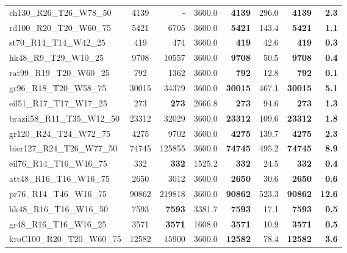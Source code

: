 \documentclass{singlecol-new}
\theoremstyle{TH}{
\newtheorem{lemma}{Lemma}
\newtheorem{theorem}[lemma]{Theorem}
\newtheorem{corrolary}[lemma]{Corrolary}
\newtheorem{conjecture}[lemma]{Conjecture}
\newtheorem{proposition}[lemma]{Proposition}
\newtheorem{claim}[lemma]{Claim}
\newtheorem{stheorem}[lemma]{Wrong Theorem}
}
\theoremstyle{THrm}{
\newtheorem{definition}{Definition}[section]
\newtheorem{question}{Question}[section]
\newtheorem{remark}{Remark}
\newtheorem{scheme}{Scheme}
}
\theoremstyle{THhit}{
\newtheorem{case}{Case}[section]
}
\begin{document}
\begin{table}
{\begin{tabular}{lcrrrrrr}
		ch130\_R26\_T26\_W78\_50    & 4139                 & -               & 3600.0 & \textbf{4139}         & 296.0           & \textbf{4139}  & \textbf{2.3}    \\
		rd100\_R20\_T20\_W60\_75    & 5421                 & 6705            & 3600.0 & \textbf{5421}         & 143.4           & \textbf{5421}  & \textbf{1.1}    \\
		st70\_R14\_T14\_W42\_25     & 419                  & 474             & 3600.0 & \textbf{419}          & 42.6            & \textbf{419}   & \textbf{0.3}    \\
		hk48\_R9\_T29\_W10\_25      & 9708                 & 10557           & 3600.0 & \textbf{9708}         & 50.5            & \textbf{9708}  & \textbf{0.4}    \\
		rat99\_R19\_T20\_W60\_25    & 792                  & 1362            & 3600.0 & \textbf{792}          & 12.8            & \textbf{792}   & \textbf{0.1}    \\
		gr96\_R18\_T20\_W58\_75     & 30015                & 34379           & 3600.0 & \textbf{30015}        & 467.1           & \textbf{30015} & \textbf{5.1}    \\
		eil51\_R17\_T17\_W17\_25    & 273                  & \textbf{273}    & 2666.8 & \textbf{273}          & 94.6            & \textbf{273}   & \textbf{1.3}    \\
		brazil58\_R11\_T35\_W12\_50 & 23312                & 32029           & 3600.0 & \textbf{23312}        & 109.6           & \textbf{23312} & \textbf{1.8}    \\
		gr120\_R24\_T24\_W72\_75    & 4275                 & 9702            & 3600.0 & \textbf{4275}         & 139.7           & \textbf{4275}  & \textbf{2.3}    \\
		bier127\_R24\_T26\_W77\_50  & 74745                & 125855          & 3600.0 & \textbf{74745}        & 495.2           & \textbf{74745} & \textbf{8.9}    \\
		eil76\_R14\_T16\_W46\_75    & 332                  & \textbf{332}    & 1525.2 & \textbf{332}          & 24.5            & \textbf{332}   & \textbf{0.4}    \\
		att48\_R16\_T16\_W16\_75    & 2650                 & 3012            & 3600.0 & \textbf{2650}         & 30.6            & \textbf{2650}  & \textbf{0.6}    \\
		pr76\_R14\_T46\_W16\_75     & 90862                & 219818          & 3600.0 & \textbf{90862}        & 523.3           & \textbf{90862} & \textbf{12.6}   \\
		hk48\_R16\_T16\_W16\_50     & 7593                 & \textbf{7593}   & 3381.7 & \textbf{7593}         & 17.1            & \textbf{7593}  & \textbf{0.5}    \\
		gr48\_R16\_T16\_W16\_25     & 3571                 & \textbf{3571}   & 1608.0 & \textbf{3571}         & 10.9            & \textbf{3571}  & \textbf{0.5}    \\
		kroC100\_R20\_T20\_W60\_75  & 12582                & 15900           & 3600.0 & \textbf{12582}        & 78.4            & \textbf{12582} & \textbf{3.6}   \\
		\hline
	\end{tabular}
}
\end{table}
\end{document}
